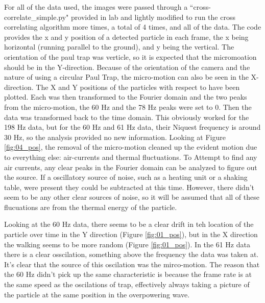 \documentclass[12pt]{article}
\begin{document}
For all of the data used, the images were passed through a ``cross-correlate\_simple.py" provided in lab and lightly modified to run the cross correlating algorithm more times, a total of 4 times, and all of the data. The code provides the x and y position of a detected particle in each frame, the x being horizontal (running parallel to the ground), and y being the vertical. The orientation of the paul trap was verticle, so it is expected that the micromoation should be in the Y-direction. Because of the orientation of the camera and the nature of using a circular Paul Trap, the micro-motion can also be seen in the X-direction. The X and Y positions of the particles with respect to have been plotted. Each was then transformed to the Fourier domain and the two peaks from the micro-motion, the 60 Hz and the 78 Hz peaks were set to 0. Then the data was transformed back to the time domain. This obviously worked for the 198 Hz data, but for the 60 Hz and 61 Hz data, their Niquest frequency is around 30 Hz, so the analysis provided no new information. Looking at Figure \ref{fig:04_pos}, the removal of the micro-motion cleaned up the evident motion due to everything else: air-currents and thermal fluctuations. To Attempt to find any air currents, any clear peaks in the Fourier domain can be analyzed to figure out the source. If a oscillatory source of noise, such as a heating unit or a shaking table, were present they could be subtracted at this time. However, there didn't seem to be any other clear sources of noise, so it will be assumed that all of these flucuations are from the thermal energy of the particle. 

Looking at the 60 Hz data, there seems to be a clear drift in teh location of the particle over time in the Y direction (Figure \ref{fig:01_pos}), but in the X direction the walking seems to be more random (Figure \ref{fig:01_pos}). In the 61 Hz data there is a clear osscilation, something above the frequency the data was taken at. It's clear that the source of this oscilation was the mirco-motion. The reason that the 60 Hz didn't pick up the same characteristic is because the frame rate is at the same speed as the oscilations of trap, effectively always taking a picture of the particle at the same position in the overpowering wave. 
\end{document}
